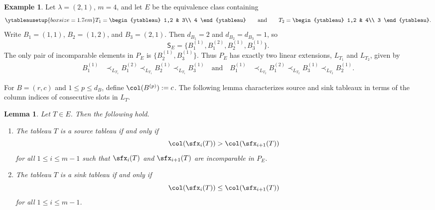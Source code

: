 \documentclass[12pt, reqno]{amsart}
\numberwithin{equation}{section}
\numberwithin{figure}{section}
\numberwithin{table}{section}
\newtheorem{lemma}[theorem]{Lemma}
\theoremstyle{definition}
\newtheorem{example}[theorem]{Example}
\begin{document}
\begin{example}\label{ex: slot poset}
Let $\lambda=(2,1)$, $m=4$, and let $E$ be the equivalence class containing
\[
\begingroup
\ytableausetup{boxsize=1.7em}
T_1=
\begin{ytableau}
1,2 & 3\\
4
\end{ytableau}
\qquad\text{and}\qquad
T_2=
\begin{ytableau}
1,2 & 4\\
3
\end{ytableau}.
\endgroup
\]
Write $B_1=(1,1)$, $B_2=(1,2)$, and $B_3=(2,1)$.
Then $d_{B_1}=2$ and $d_{B_2}=d_{B_3}=1$, so
\[
\mathsf{S}_E=\{B_1^{(1)},B_1^{(2)},B_2^{(1)},B_3^{(1)}\}.
\]
The only pair of incomparable elements in $P_E$ is $\{B_2^{(1)},B_3^{(1)}\}$.
Thus $P_E$ has exactly two linear extensions, $L_{T_1}$ and $L_{T_2}$, given by
\[
\begin{aligned}
B_1^{(1)}
&\prec_{L_{T_1}}B_1^{(2)}
\prec_{L_{T_1}}B_2^{(1)}
\prec_{L_{T_1}}B_3^{(1)}
\quad\text{and}\quad
B_1^{(1)}
&\prec_{L_{T_2}}B_1^{(2)}
\prec_{L_{T_2}}B_3^{(1)}
\prec_{L_{T_2}}B_2^{(1)}.
\end{aligned}
\]
\end{example}

For $B=(r,c)$ and $1 \le p \le d_B$, define $\col(B^{(p)}):=c$.
The following lemma characterizes source and sink tableaux in terms of the column indices of consecutive slots in $L_T$.

\begin{lemma}\label{lem: source sink characterization}
Let $T \in E$.
Then the following hold.
\begin{enumerate}[label = {\rm (\arabic*)}]
\item The tableau $T$ is a source tableau if and only if
\[
\col(\sfx_i(T))>\col(\sfx_{i+1}(T))
\]
for all $1 \le i \le m-1$ such that $\sfx_i(T)$ and $\sfx_{i+1}(T)$ are incomparable in $P_E$.
\item The tableau $T$ is a sink tableau if and only if
\[
\col(\sfx_i(T))\le\col(\sfx_{i+1}(T))
\]
for all $1 \le i \le m-1$.
\end{enumerate}
\end{lemma}
\end{document}
